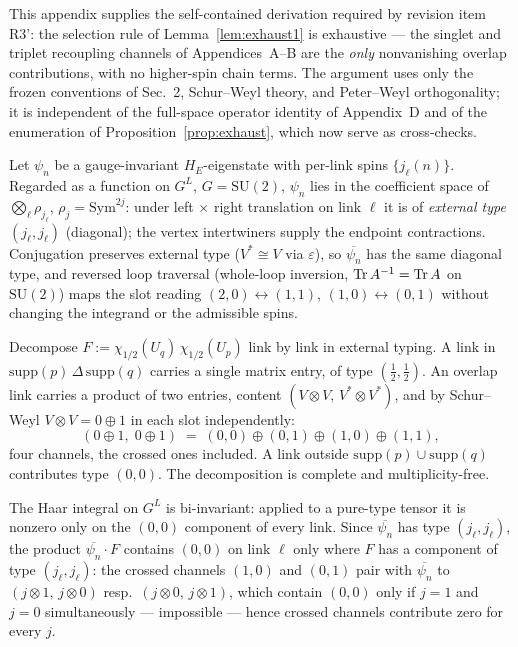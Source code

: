 This appendix supplies the self-contained derivation required by
revision item R3': the selection rule of Lemma~\ref{lem:exhaust1} is
exhaustive --- the singlet and triplet recoupling channels of
Appendices~A--B are the \emph{only} nonvanishing overlap contributions,
with no higher-spin chain terms. The argument uses only the frozen
conventions of Sec.~2, Schur--Weyl theory, and Peter--Weyl
orthogonality; it is independent of the full-space operator identity of
Appendix~D and of the enumeration of Proposition~\ref{prop:exhaust},
which now serve as cross-checks.

\begin{lemma}
\label{lem:extype}
Let $\psi_n$ be a gauge-invariant $H_E$-eigenstate with per-link spins
$\{j_\ell(n)\}$. Regarded as a function on $G^L$, $G=\mathrm{SU}(2)$,
$\psi_n$ lies in the coefficient space of $\bigotimes_\ell
\rho_{j_\ell}$, $\rho_j=\mathrm{Sym}^{2j}$: under left $\times$ right
translation on link $\ell$ it is of \emph{external type} $(j_\ell,j_\ell)$
(diagonal); the vertex intertwiners supply the endpoint contractions.
Conjugation preserves external type ($V^*\cong V$ via $\varepsilon$), so
$\overline{\psi_n}$ has the same diagonal type, and reversed loop
traversal (whole-loop inversion, $\operatorname{Tr} A^{-1}=\operatorname{Tr} A$ on $\mathrm{SU}(2)$)
maps the slot reading $(2,0)\leftrightarrow(1,1)$, $(1,0)\leftrightarrow
(0,1)$ without changing the integrand or the admissible spins.
\end{lemma}

\begin{lemma}
\label{lem:fourt}
Decompose $F:=\chi_{1/2}(U_q)\,\chi_{1/2}(U_p)$ link by link in external
typing. A link in $\mathrm{supp}(p)\,\Delta\,\mathrm{supp}(q)$ carries a
single matrix entry, of type $(\tfrac12,\tfrac12)$. An overlap link
carries a product of two entries, content $(V\otimes V,\,
V^*\otimes V^*)$, and by Schur--Weyl $V\otimes V=0\oplus 1$ in each slot
independently:
\[
(0\oplus 1,\;0\oplus 1)\;=\;(0,0)\oplus(0,1)\oplus(1,0)\oplus(1,1),
\]
four channels, the crossed ones included. A link outside
$\mathrm{supp}(p)\cup\mathrm{supp}(q)$ contributes type $(0,0)$. The
decomposition is complete and multiplicity-free.
\end{lemma}

\begin{lemma}
\label{lem:cross}
The Haar integral on $G^L$ is bi-invariant: applied to a pure-type tensor
it is nonzero only on the $(0,0)$ component of every link. Since
$\overline{\psi_n}$ has type $(j_\ell,j_\ell)$, the product
$\overline{\psi_n}\cdot F$ contains $(0,0)$ on link $\ell$ only where
$F$ has a component of type $(j_\ell,j_\ell)$: the crossed channels
$(1,0)$ and $(0,1)$ pair with $\overline{\psi_n}$ to $(j\otimes 1,\,
j\otimes 0)$ resp.~$(j\otimes 0,\, j\otimes 1)$, which contain $(0,0)$
only if $j=1$ and $j=0$ simultaneously --- impossible --- hence crossed
channels contribute zero for every $j$.
\end{lemma}

